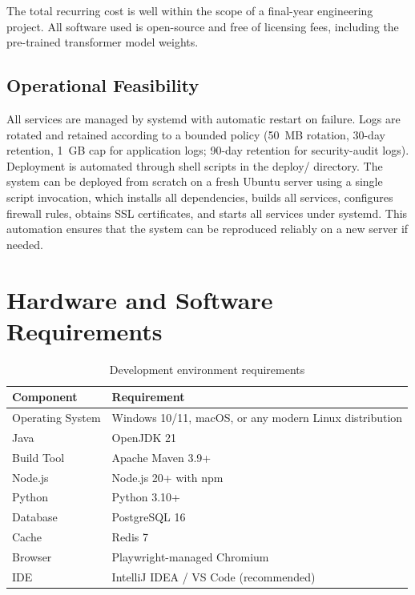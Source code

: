 \documentclass[12pt,a4paper,oneside]{report}
\renewcommand{\texttt}[1]{%
  {\ttfamily\hyphenchar\font=45\relax #1}}
\begin{document}
The total recurring cost is well within the scope of a final-year
engineering project. All software used is open-source and free of
licensing fees, including the pre-trained transformer model weights.

\subsection{Operational Feasibility}
All services are managed by \texttt{systemd} with automatic restart on
failure. Logs are rotated and retained according to a bounded policy
(50~MB rotation, 30-day retention, 1~GB cap for application logs;
90-day retention for security-audit logs). Deployment is automated
through shell scripts in the \texttt{deploy/} directory. The system
can be deployed from scratch on a fresh Ubuntu server using a single
script invocation, which installs all dependencies, builds all services,
configures firewall rules, obtains SSL certificates, and starts all
services under \texttt{systemd}. This automation ensures that the system
can be reproduced reliably on a new server if needed.

\section{Hardware and Software Requirements}

\begin{table}[ht]
\centering
\caption{Development environment requirements}
\label{tab:dev_env}
\begin{tabularx}{\textwidth}{l X}
\toprule
\textbf{Component} & \textbf{Requirement} \\
\midrule
Operating System & Windows 10/11, macOS, or any modern Linux distribution \\
Java             & OpenJDK 21 \\
Build Tool       & Apache Maven 3.9+ \\
Node.js          & Node.js 20+ with npm \\
Python           & Python 3.10+ \\
Database         & PostgreSQL 16 \\
Cache            & Redis 7 \\
Browser          & Playwright-managed Chromium \\
IDE              & IntelliJ IDEA / VS Code (recommended) \\
\bottomrule
\end{tabularx}
\end{table}
\end{document}
